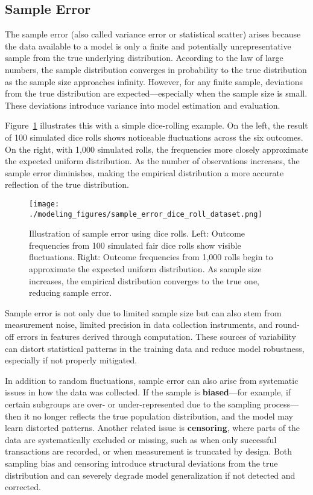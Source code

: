 \documentclass[12pt,openany, draft]{book}
\begin{document}
\subsection{Sample Error}  \label{subsec:sample_error}

The sample error (also called variance error or statistical scatter) arises because the data available to a model is only a finite and potentially unrepresentative sample from the true underlying distribution. According to the law of large numbers, the sample distribution converges in probability to the true distribution as the sample size approaches infinity. However, for any finite sample, deviations from the true distribution are expected—especially when the sample size is small. These deviations introduce variance into model estimation and evaluation. \newline

Figure~\ref{fig:sample-error-dice} illustrates this with a simple dice-rolling example. On the left, the result of 100 simulated dice rolls shows noticeable fluctuations across the six outcomes. On the right, with 1,000 simulated rolls, the frequencies more closely approximate the expected uniform distribution. As the number of observations increases, the sample error diminishes, making the empirical distribution a more accurate reflection of the true distribution. \newline

\begin{figure}[H]
    \centering
    \texttt{[image: ./modeling\_figures/sample\_error\_dice\_roll\_dataset.png]}
    \caption{
    Illustration of sample error using dice rolls. Left: Outcome frequencies from 100 simulated fair dice rolls show visible fluctuations. Right: Outcome frequencies from 1,000 rolls begin to approximate the expected uniform distribution. As sample size increases, the empirical distribution converges to the true one, reducing sample error.
    }
    \label{fig:sample-error-dice}
\end{figure}

Sample error is not only due to limited sample size but can also stem from measurement noise, limited precision in data collection instruments, and round-off errors in features derived through computation. These sources of variability can distort statistical patterns in the training data and reduce model robustness, especially if not properly mitigated. \newline

In addition to random fluctuations, sample error can also arise from systematic issues in how the data was collected. If the sample is \textbf{biased}—for example, if certain subgroups are over- or under-represented due to the sampling process—then it no longer reflects the true population distribution, and the model may learn distorted patterns. Another related issue is \textbf{censoring}, where parts of the data are systematically excluded or missing, such as when only successful transactions are recorded, or when measurement is truncated by design. Both sampling bias and censoring introduce structural deviations from the true distribution and can severely degrade model generalization if not detected and corrected.
\end{document}
